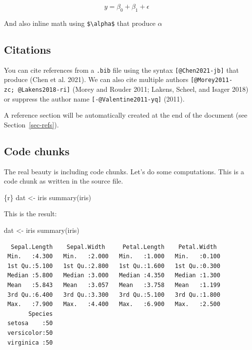 \documentclass[
  letterpaper,
  DIV=11,
  numbers=noendperiod]{scrartcl}
\newenvironment{Shaded}{\begin{snugshade}}{\end{snugshade}}
\newcommand{\FunctionTok}[1]{\textcolor[rgb]{0.28,0.35,0.67}{#1}}
\newcommand{\NormalTok}[1]{\textcolor[rgb]{0.00,0.23,0.31}{#1}}
\newcommand{\OtherTok}[1]{\textcolor[rgb]{0.00,0.23,0.31}{#1}}
\begin{document}
\[
y = \beta_0 + \beta_1 + \epsilon
\]

And also inline math using \texttt{\$\textbackslash{}alpha\$} that
produce \(\alpha\)

\hypertarget{sec-citations}{%
\subsection{Citations}\label{sec-citations}}

You can cite references from a \texttt{.bib} file using the syntax
\texttt{{[}@Chen2021-jb{]}} that produce (Chen et al. 2021). We can also
cite multiple authors \texttt{{[}@Morey2011-zc;\ @Lakens2018-ri{]}}
(Morey and Rouder 2011; Lakens, Scheel, and Isager 2018) or suppress the
author name \texttt{{[}-@Valentine2011-yq{]}} (2011).

A reference section will be automatically created at the end of the
document (see Section~\ref{sec-refs}).

\hypertarget{code-chunks}{%
\subsection{Code chunks}\label{code-chunks}}

The real beauty is including code chunks. Let's do some computations.
This is a code chunk as written in the source file.

\begin{Shaded}
\begin{Highlighting}[]
\NormalTok{\textasciigrave{}\textasciigrave{}\textasciigrave{}\{r\}}
\NormalTok{dat \textless{}{-} iris}
\NormalTok{summary(iris)}
\NormalTok{\textasciigrave{}\textasciigrave{}\textasciigrave{}}
\end{Highlighting}
\end{Shaded}

This is the result:

\begin{Shaded}
\begin{Highlighting}[]
\NormalTok{dat }\OtherTok{\textless{}{-}}\NormalTok{ iris}
\FunctionTok{summary}\NormalTok{(iris)}
\end{Highlighting}
\end{Shaded}

\begin{verbatim}
  Sepal.Length    Sepal.Width     Petal.Length    Petal.Width   
 Min.   :4.300   Min.   :2.000   Min.   :1.000   Min.   :0.100  
 1st Qu.:5.100   1st Qu.:2.800   1st Qu.:1.600   1st Qu.:0.300  
 Median :5.800   Median :3.000   Median :4.350   Median :1.300  
 Mean   :5.843   Mean   :3.057   Mean   :3.758   Mean   :1.199  
 3rd Qu.:6.400   3rd Qu.:3.300   3rd Qu.:5.100   3rd Qu.:1.800  
 Max.   :7.900   Max.   :4.400   Max.   :6.900   Max.   :2.500  
       Species  
 setosa    :50  
 versicolor:50  
 virginica :50  
                
                
                
\end{verbatim}
\end{document}
